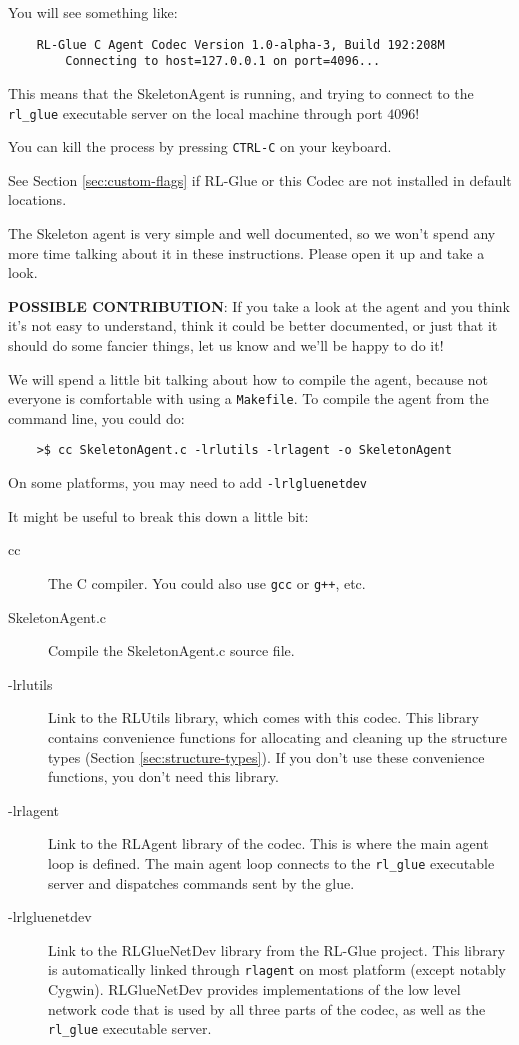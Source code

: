 \documentclass[11pt]{article}
\begin{document}
You will see something like:
\begin{verbatim}
	RL-Glue C Agent Codec Version 1.0-alpha-3, Build 192:208M
		Connecting to host=127.0.0.1 on port=4096...
\end{verbatim}

This means that the SkeletonAgent is running, and trying to connect to the \texttt{rl\_glue} executable server on the local machine through port $4096$! 

You can kill the process by pressing \texttt{CTRL-C} on your keyboard.

See Section \ref{sec:custom-flags} if RL-Glue or this Codec are not installed in default locations.

The Skeleton agent is very simple and well documented, so we won't spend any more time talking about it in these instructions.
Please open it up and take a look.

\textbf{POSSIBLE CONTRIBUTION}: If you take a look at the agent and you think it's not easy to understand, think it could be better documented, 
or just that it should do some fancier things, let us know and we'll be happy to do it!

We will spend a little bit talking about how to compile the agent, because not everyone is comfortable with using a \texttt{Makefile}.  To compile
the agent from the command line, you could do:
\begin{verbatim}
	>$ cc SkeletonAgent.c -lrlutils -lrlagent -o SkeletonAgent
\end{verbatim}

On some platforms, you may need to add \texttt{-lrlgluenetdev}

It might be useful to break this down a little bit:
\begin{description}
\item [cc] The C compiler.  You could also use \texttt{gcc} or \texttt{g++}, etc.
\item [SkeletonAgent.c] Compile the SkeletonAgent.c source file.
\item [-lrlutils] Link to the RLUtils library, which comes with this codec.  This library contains convenience functions for allocating and cleaning up the structure types (Section \ref{sec:structure-types}).  If you 
don't use these convenience functions, you don't need this library.
\item [-lrlagent] Link to the RLAgent library of the codec.  This is where the main agent loop is defined. The main agent loop connects to the \texttt{rl\_glue} executable server and dispatches commands sent by the glue.
\item [-lrlgluenetdev] Link to the RLGlueNetDev library from the RL-Glue project.  This library is automatically linked through \texttt{rlagent} on most platform (except notably Cygwin).  
RLGlueNetDev provides implementations of the low level network code that is used by all three parts of the codec, as well as the \texttt{rl\_glue} executable server.
\end{description}
\end{document}
